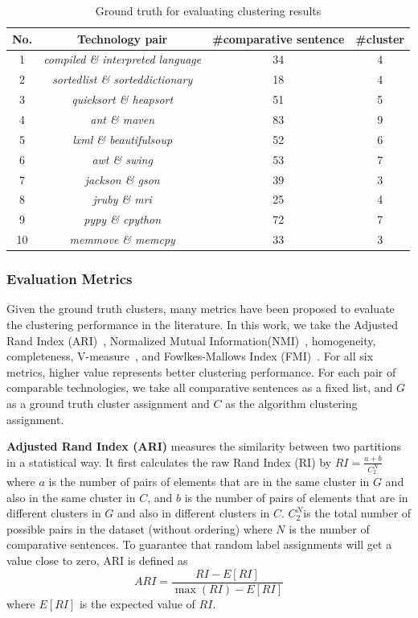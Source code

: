 \begin{table}
	\centering
	\small
	\caption{Ground truth for evaluating clustering results}
	\vspace{-2mm}
	\setlength{\tabcolsep}{0.01em}
	\begin{tabular}{c c c c}
	\hline
	\textbf{No.} & \textbf{Technology pair} & \textbf{\#comparative sentence} & \textbf{\#cluster} \\ \hline
	1 & \textit{compiled \& interpreted language} & 34 & 4 \\
    2 & \textit{sortedlist \& sorteddictionary} & 18 & 4 \\
	3 & \textit{quicksort \& heapsort} & 51 & 5 \\
	4 & \textit{ant \& maven} & 83 & 9 \\
	5 & \textit{lxml \& beautifulsoup} & 52 & 6 \\
	6 & \textit{awt \& swing} & 53 & 7 \\
	7 & \textit{jackson \& gson} & 39 & 3 \\
	8 & \textit{jruby \& mri} & 25 & 4 \\
	9 & \textit{pypy \& cpython} & 72 & 7 \\
	10 & \textit{memmove \& memcpy} & 33 & 3 \\
	\hline
	\end{tabular}
	\vspace{-3mm}
	\label{tab:groundTruth}
\end{table}

\subsubsection{Evaluation Metrics}
\label{sec:clusteringGroundTruth}
Given the ground truth clusters, many metrics have been proposed to evaluate the clustering performance in the literature.
In this work, we take the Adjusted Rand Index (ARI)~\cite{hubert1985comparing}, Normalized Mutual Information(NMI)~\cite{vinh2010information}, homogeneity, completeness, V-measure~\cite{rosenberg2007v}, and Fowlkes-Mallows Index (FMI)~\cite{fowlkes1983method}.
For all six metrics, higher value represents better clustering performance.
For each pair of comparable technologies, we take all comparative sentences as a fixed list, and $G$ as a ground truth cluster assignment and $C$ as the algorithm clustering assignment.

\textbf{Adjusted Rand Index (ARI)} measures the similarity between
two partitions in a statistical way.
It first calculates the raw Rand Index (RI) by $ RI = \frac{a+b}{C^{N}_{2}}$ where $a$ is the number of pairs of elements that are in the same cluster in $G$ and also in the same cluster in $C$, and $b$ is the number of pairs of elements that are in different clusters in $G$ and also in different clusters in $C$.
$C^{N}_{2}$is the total number of possible pairs in the dataset (without ordering) where $N$ is the number of comparative sentences.
To guarantee that random label assignments will get a value close to zero, ARI is defined as 
$$ ARI = \frac{RI - E[RI]}{\max (RI) - E[RI]}$$
where $E[RI]$ is the expected value of $RI$.

